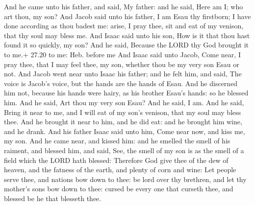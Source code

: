  And he came unto his father, and said, My father: and he
said, Here am I; who art thou, my son?  And Jacob said unto
his father, I am Esau thy firstborn; I have done according as thou
badest me: arise, I pray thee, sit and eat of my venison, that thy soul
may bless me.  And Isaac said unto his son, How is it that
thou hast found it so quickly, my son? And he said, Because the LORD thy
God brought it to me.+ 27.20 to me: Heb. before me  And
Isaac said unto Jacob, Come near, I pray thee, that I may feel thee, my
son, whether thou be my very son Esau or not.  And Jacob
went near unto Isaac his father; and he felt him, and said, The voice is
Jacob's voice, but the hands are the hands of Esau.  And he
discerned him not, because his hands were hairy, as his brother Esau's
hands: so he blessed him.  And he said, Art thou my very
son Esau? And he said, I am.  And he said, Bring it near to
me, and I will eat of my son's venison, that my soul may bless thee. And
he brought it near to him, and he did eat: and he brought him wine, and
he drank.  And his father Isaac said unto him, Come near
now, and kiss me, my son.  And he came near, and kissed
him: and he smelled the smell of his raiment, and blessed him, and said,
See, the smell of my son is as the smell of a field which the LORD hath
blessed:  Therefore God give thee of the dew of heaven, and
the fatness of the earth, and plenty of corn and wine:  Let
people serve thee, and nations bow down to thee: be lord over thy
brethren, and let thy mother's sons bow down to thee: cursed be every
one that curseth thee, and blessed be he that blesseth thee.

